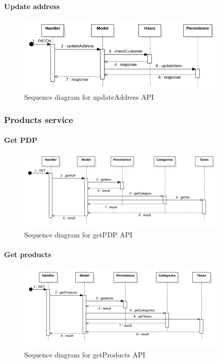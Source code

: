 \paragraph*{Update address}
\begin{figure}[H]
    \includegraphics[width=0.9\textwidth]{res/images/sequence-diagrams/addresses/updateAddress.png}
    \caption{Sequence diagram for updateAddress API}
\end{figure}


\subsubsection{Products service}
\paragraph*{Get PDP}
\begin{figure}[H]
    \includegraphics[width=0.9\textwidth]{res/images/sequence-diagrams/products/getPDP.png}
    \caption{Sequence diagram for getPDP API}
\end{figure}

\paragraph*{Get products}
\begin{figure}[H]
    \includegraphics[width=0.9\textwidth]{res/images/sequence-diagrams/products/getProducts.png}
    \caption{Sequence diagram for getProducts API}
\end{figure}

